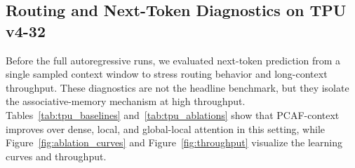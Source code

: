 \documentclass[11pt]{article}
\newcommand{\tableformat}{\footnotesize\setlength{\tabcolsep}{4pt}\renewcommand{\arraystretch}{1.08}}
\begin{document}
\subsection{Routing and Next-Token Diagnostics on TPU v4-32}

Before the full autoregressive runs, we evaluated next-token prediction from a
single sampled context window to stress routing behavior and long-context
throughput. These diagnostics are not the headline benchmark, but they isolate
the associative-memory mechanism at high throughput. Tables~\ref{tab:tpu_baselines}
and~\ref{tab:tpu_ablations} show that PCAF-context improves over dense,
local, and global-local attention in this setting, while
Figure~\ref{fig:ablation_curves} and Figure~\ref{fig:throughput} visualize the
learning curves and throughput.

\begin{table}[!htbp]
  \centering
  \caption{Next-token diagnostic baselines on WikiText-103 using TPU v4-32. Throughput is reported in million tokens per second across the full pod.}
  \label{tab:tpu_baselines}
  \begingroup
  \tableformat
  \endgroup
\end{table}
\end{document}
